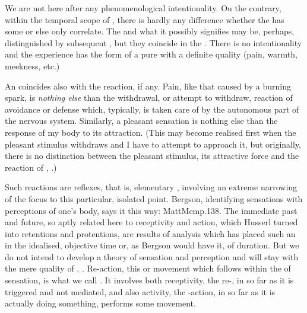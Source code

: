 We are not here after any phenomenological intentionality. On the 
contrary, within the temporal scope of 
, there is hardly any difference whether the  
has some  or else only  correlate. The 
 and what it possibly signifies
may be, perhaps, distinguished by subsequent , 
but they coincide in the . There is no 
intentionality and the experience has the form of a pure  
with a definite quality (pain, warmth, meekness, etc.)

\pa An  coincides also with the reaction, if any.  Pain, like
that caused by a burning spark, is {\em nothing else} than the 
withdrawal, or attempt to withdraw, reaction of avoidance or defense which,
typically, is taken care of by the autonomous part of the nervous system.
Similarly, a pleasant sensation is nothing else than the response of my body to
its attraction. (This may become  realised first when
the pleasant stimulus withdraws and I have to attempt to approach it, but
originally, there is no distinction between the pleasant stimulus, its
attractive force and the reaction of , .)

Such reactions are {reflexes}, that is, elementary ,
involving an extreme narrowing of the focus to this particular, isolated point.
Bergson, identifying sensations with perceptions of one's body, says it this
way: 
\citet{The psychical state, then, that I call ``my present'', must be both a
  perception of immediate past and a determination of immediate future. Now, the
  immediate past, in so far as it is perceived, is, as we shall see,
  sensation,[...] and the immediate future, in so far as it is being determined,
  is action or movement.}{MattMem}{p.138. The immediate past
  and future, so aptly related here to receptivity and action, which Husserl
  turned into retentions and protentions, are results of analysis which has
  placed such an  in the idealised, objective time or,
  as Bergson would have it, of duration.  But we do not intend to develop a
  theory of sensation and perception and will stay with the mere quality of
  , .}
%
Re-action, this  or movement which follows within the  of
sensation, is what we call . It involves both receptivity, the re-, in
so far as it is triggered and not mediated, and also activity, the -action, in
so far as it is actually doing something, performs some movement.

